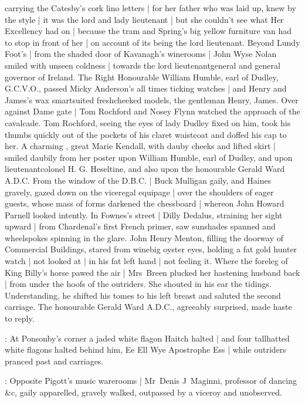 carrying the Catesby's cork lino letters |
for her father who was laid up,
knew by the style |
it was the lord and lady lieutenant |
but she couldn't see
what Her Excellency had on |
because the tram 
and Spring's big yellow furniture van
had to stop in front of her |
on account of its being the lord lieutenant.
Beyond Lundy Foot's |
from the shaded door of Kavanagh's winerooms |
John Wyse Nolan smiled with unseen coldness |
towards the lord lieutenantgeneral and general governor of Ireland.
The Right Honourable
William Humble,
earl of Dudley,
G.C.V.O.,
passed Micky Anderson's
all times ticking watches |
and Henry and James's wax smartsuited freshcheeked models,
the gentleman Henry,
 James.
Over against Dame gate |
Tom Rochford and Nosey Flynn
watched the approach of the cavalcade.
Tom Rochford,
seeing the eyes of lady Dudley fixed on him,
took his thumbs
quickly out of the pockets of his claret waistcoat
and doffed his cap to her.%
A charming ,
great Marie Kendall, with dauby cheeks and lifted skirt |
smiled daubily from her poster
upon William Humble, earl of Dudley,
and upon lieutenant\-colonel H. G. Heseltine,
and also upon the honourable Gerald Ward A.D.C.
From the window of the D.B.C. |
Buck Mulligan gaily,
and Haines gravely,
gazed down on the viceregal equipage |
over the shoulders of eager guests,
whose mass of forms
darkened the chessboard |
whereon John Howard Parnell looked intently.
In Fownes's street |
Dilly Dedalus,
straining her sight upward |
from Chardenal's first French primer,
saw sunshades spanned
and wheelspokes spinning in the glare.
John Henry Menton,
filling the doorway of Commercial Buildings,%
stared from winebig oyster eyes,
holding a fat gold hunter watch |
not looked at |
in his fat left hand |
not feeling it.
Where the foreleg of King Billy's horse pawed the air |
Mrs~Breen plucked her hastening husband back |
from under the hoofs of the outriders.
She shouted in his ear the tidings.
Understanding, he shifted his tomes to his left breast
and saluted the second carriage.
The honourable Gerald Ward A.D.C.,
agreeably surprised,
made haste to reply.

:
At Ponsonby's corner
a jaded white flagon Haitch \stage{[H.]} halted |
and four tallhatted white flagons halted behind him,
Ee Ell Wye Apostrophe Ess \stage{[E.L.Y.'S]} |
while outriders pranced past
and carriages.

:
Opposite Pigott's music warerooms |
Mr~Denis J~Maginni,
professor of dancing \&c,
gaily apparelled,
gravely walked,%
outpassed by a viceroy and unobserved.


